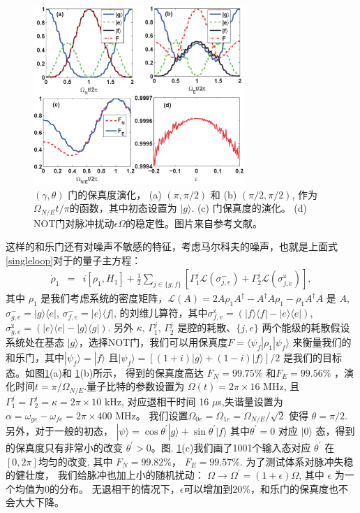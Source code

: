 \documentclass[supercite]{HustGraduPaper}
\begin{document}
\begin{figure}[tbp]\centering
	\includegraphics[width=8cm]{Figures/transmon/f1.eps}
	\caption{ $(\gamma, \theta)$ 门的保真度演化，  (a) $(\pi, \pi/2)$ 和 (b) $(\pi/2, \pi/2)$, 作为 $\Omega_{N/E}t/\pi$的函数，其中初态设置为 $|g\rangle$. (c) 门保真度的演化。 (d) NOT门对脉冲扰动$\epsilon\Omega$的稳定性。图片来自参考文献\cite{hong2018implementing}。 }
	\label{Fig f1}
\end{figure}
这样的和乐门还有对噪声不敏感的特征，考虑马尔科夫的噪声，也就是上面式\ref{singleloop}对于的量子主方程：
\begin{eqnarray}  \label{me}
\dot\rho_1 &=& i[\rho_1, H_1]  + \frac{1}{2} \sum_{j\in\{g, f\}} \left[ \Gamma_1^{j} \mathcal{L}(\sigma^-_{j,e}) + \Gamma_2^{j} \mathcal{L}(\sigma^\text{z}_{j,e})\right],
\end{eqnarray}
其中 $\rho_1$  是我们考虑系统的密度矩阵，$\mathcal{L}(A)=2A\rho_1 A^\dagger-A^\dagger A \rho_1 -\rho_1 A^\dagger A$ 是 $A$, $\sigma^-_{g,e}=|g\rangle\langle e|$, $\sigma^-_{f,e}=|e\rangle\langle f|$, 的刘维儿算符，其中$\sigma^\text{z}_{f,e}= (|f\rangle\langle f|-|e\rangle\langle e|)$, $\sigma^\text{z}_{g,e}= (|e\rangle\langle e|-|g\rangle\langle g|)$. 另外
$\kappa$, $\Gamma_1^j$,  $\Gamma_2^j$ 是腔的耗散、$\{j,e\}$ 两个能级的耗散假设系统处在基态 $|g\rangle$，选择NOT门，我们可以用保真度$F=\langle\psi_f|\rho_1|\psi_f\rangle$ 来衡量我们的和乐门，其中$|\psi_f\rangle=|f\rangle$ 且$|\psi_f\rangle=[(1+i)|g\rangle+(1-i)|f\rangle]/2$ 是我们的目标态。如图\ref{Fig f1}(a)和 \ref{Fig f1}(b)所示，
得到的保真度高达 $F _{N}= 99.75\%$ 和$F _{E}= 99.56\%$ ，演化时间$t=\pi/\Omega_{N/E}$.量子比特的参数设置为 $\Omega(t) = 2\pi\times 16$ MHz,  且 $\Gamma_1^j=\Gamma_2^j= \kappa=2\pi \times 10$ kHz,  对应退相干时间 16 $\mu$s,失谐量设置为 $\alpha=\omega_{ge}-\omega_{fe}=2\pi\times 400$ MHz。 我们设置$\Omega_{0e}=\Omega_{1e}= \Omega_{N/E}/\sqrt{2}$ 使得 $\theta = \pi/2$. 
另外，对于一般的初态，
 $|\psi\rangle=\cos\theta^{'}|g\rangle+\sin\theta^{'}|f\rangle$ 其中$\theta^{'}=0$ 对应 $|0\rangle$ 态，得到的保真度只有非常小的改变 $\theta^{'}>0$。图. \ref{Fig f1}(c)我们画了1001个输入态对应 $\theta^{'}$ 在 $[0,2\pi]$均匀的改变, 其中 $F _{N}= 99.82\%$， $F _{E}= 99.57\%$. 为了测试体系对脉冲失稳的健壮度， 我们给脉冲也加上小的随机扰动： $\Omega\to \Omega^{'}=(1+\epsilon)\Omega$, 其中 $\epsilon$ 为一个均值为$0$的分布。 无退相干的情况下，$\epsilon$可以增加到$20\%$，和乐门的保真度也不会大大下降。
\end{document}
